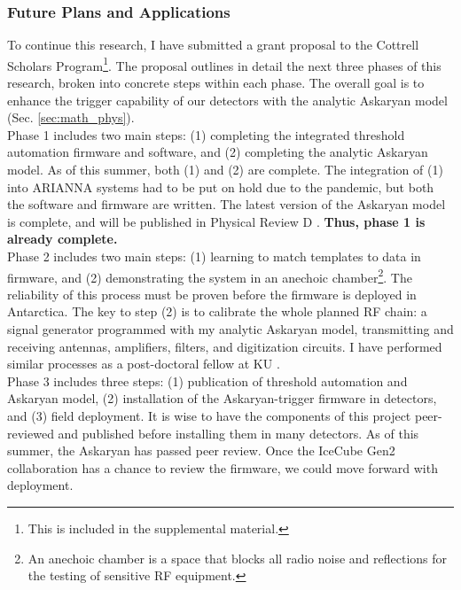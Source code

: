 \documentclass[../../../main.tex]{subfiles}
\begin{document}
\subsubsection{Future Plans and Applications}

To continue this research, I have submitted a grant proposal to the Cottrell Scholars Program\footnote{This is included in the supplemental material.}.  The proposal outlines in detail the next three phases of this research, broken into concrete steps within each phase.  The overall goal is to enhance the trigger capability of our detectors with the analytic Askaryan model (Sec. \ref{sec:math_phys}).
\\
\vspace{0.15cm}
Phase 1 includes two main steps: (1) completing the integrated threshold automation firmware and software, and (2) completing the analytic Askaryan model.  As of this summer, both (1) and (2) are complete.  The integration of (1) into ARIANNA systems had to be put on hold due to the pandemic, but both the software and firmware are written.  The latest version of the Askaryan model is complete, and will be published in Physical Review D \cite{time}.  \textbf{Thus, phase 1 is already complete.}
\\
\vspace{0.15cm}
Phase 2 includes two main steps: (1) learning to match templates to data in firmware, and (2) demonstrating the system in an anechoic chamber\footnote{An anechoic chamber is a space that blocks all radio noise and reflections for the testing of sensitive RF equipment.}.  The reliability of this process must be proven before the firmware is deployed in Antarctica.  The key to step (2) is to calibrate the whole planned RF chain: a signal generator programmed with my analytic Askaryan model, transmitting and receiving antennas, amplifiers, filters, and digitization circuits.  I have performed similar processes as a post-doctoral fellow at KU \cite{10.1016/j.astropartphys.2014.09.002}.
\\
\vspace{0.15cm}
Phase 3 includes three steps: (1) publication of threshold automation and Askaryan model, (2) installation of the Askaryan-trigger firmware in detectors, and (3) field deployment.  It is wise to have the components of this project peer-reviewed and published before installing them in many detectors.  As of this summer, the Askaryan has passed peer review.  Once the IceCube Gen2 collaboration has a chance to review the firmware, we could move forward with deployment.
\end{document}
